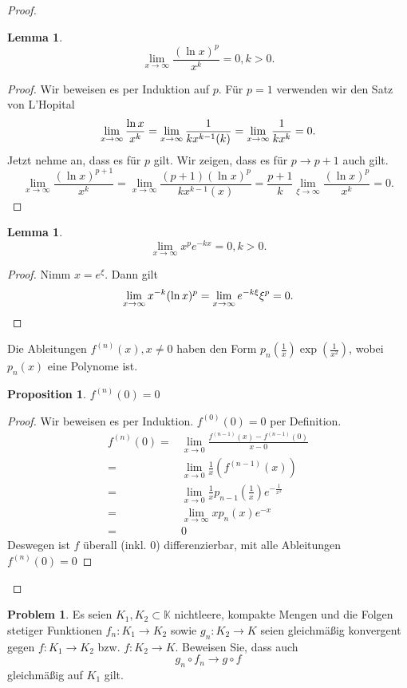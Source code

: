 \documentclass[prb,12pt]{revtex4-2}
\newtheorem{Proposition}[Theorem]{Proposition}
\newtheorem{Lemma}[Theorem]{Lemma}
\theoremstyle{definition}
\newtheorem{Problem}{Problem}
\theoremstyle{definition}
\begin{document}
\begin{proof}
\begin{enumerate}[label=\roman*)]
			\begin{Lemma}
				\[
				\lim_{x \to \infty} \frac{(\ln x)^p}{x^k}=0, k > 0
				.\] 
			\end{Lemma}
			\begin{proof}
				Wir beweisen es per Induktion auf $p$. F\"{u}r $p=1$ verwenden wir den Satz von L'Hopital
				\[
					\lim_{x \to \infty} \frac{\ln x}{x^k}=\lim_{x \to \infty} \frac{1}{kx^{k-1}(k)}=\lim_{x \to \infty} \frac{1}{kx^k}=0
				.\qedhere\] 
				Jetzt nehme an, dass es f\"{u}r $p$ gilt. Wir zeigen, dass es f\"{u}r $p\to p+1$ auch gilt. 
				\[
					\lim_{x \to \infty} \frac{(\ln x)^{p+1}}{x^k}=\lim_{x \to \infty} \frac{(p+1)(\ln x)^p}{kx^{k-1}(x)}=\frac{p+1}{k}\lim_{\xi \to \infty} \frac{(\ln x)^p}{x^k}=0
				.\] 
			\end{proof}
			\begin{Lemma}
			\[
				\lim_{x \to \infty} x^p e^{-kx}=0, k>0
			.\] 	
			\end{Lemma}
			\begin{proof}
				Nimm $x=e^\xi$. Dann gilt
				\[
					\lim_{x \to \infty} x^{-k}(\ln x)^p=\lim_{x \to \infty} e^{-k\xi}\xi^p=0
				.\qedhere\] 
			\end{proof}
			Die Ableitungen $f^{(n)}(x), x\neq 0$ haben den Form $p_n\left( \frac{1}{x} \right) \exp\left( \frac{1}{x^2} \right) $, wobei $p_n(x)$ eine Polynome ist. 
			\begin{Proposition}
				$f^{(n)}(0)=0$
			\end{Proposition}
			\begin{proof}
				Wir beweisen es per Induktion. $f^{(0)}(0)=0$ per Definition.
				\begin{align*}
					f^{(n)}(0)=&\lim_{x \to 0} \frac{f^{(n-1)}(x)-f^{(n-1)}(0)}{x-0}\\
					=&\lim_{x \to 0}  \frac{1}{x}\left( f^{(n-1)}(x) \right)\\
					=&\lim_{x \to 0} \frac{1}{x}p_{n-1}\left(\frac{1}{x}\right)e^{-\frac{1}{x^2}}\\
					=&\lim_{x \to \infty} xp_n(x)e^{-x}\\
					=&0
				\end{align*}
				Deswegen ist $f$ überall (inkl. 0) differenzierbar, mit alle Ableitungen $f^{(n)}(0)=0$
			\end{proof}
	\end{enumerate}
\end{proof}
\begin{Problem}
	Es seien $K_1 , K_2 \subset \mathbb{K}$  nichtleere, kompakte Mengen und die Folgen stetiger Funktionen $f_n : K_1 \to K_2$ sowie $g_n : K_2 \to K$  seien gleichmäßig konvergent gegen $f : K_1 \to K_2$ bzw. $f : K_2 \to K$. Beweisen Sie, dass auch
	\[
	g_n\circ f_n \to g \circ f\]
	gleichmäßig auf $K_1$ gilt.
\end{Problem}
\end{document}
